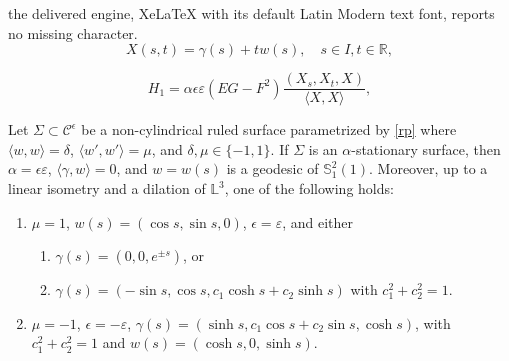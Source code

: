 \documentclass[10pt,a4paper]{amsart}
\def\l{\mathbb L}
\def\r{\mathbb R}
\def\s{\mathbb S}
\begin{document}
the delivered engine, XeLaTeX with its default Latin Modern text font, reports no missing character.
\begin{equation}
X(s,t)=\gamma(s)+tw(s), \quad s\in I, t\in \r,\label{rp}
\end{equation}

\begin{equation}
H_1=\alpha\epsilon\varepsilon(EG-F^2)\frac{(X_s,X_t,X)}{\langle X,X\rangle}, \label{ss3}
\end{equation}

\begin{theorem} \label{th-nli}
Let $\Sigma \subset \mathcal{C}^\epsilon$ be a   non-cylindrical ruled surface parametrized by \eqref{rp} where $\langle w,w\rangle=\delta$, $\langle w',w' \rangle=\mu$, and $\delta,\mu\in \{-1,1 \}$. If $\Sigma$ is an $\alpha$-stationary surface, then $\alpha = \epsilon \varepsilon$, $\langle \gamma,w\rangle =0$, and $w=w(s)$ is a geodesic of $\s_1^2(1)$. Moreover, up to a linear isometry and a dilation of $\l^3$, one of the following holds:
\begin{enumerate}
\item $\mu=1$, $w(s)=(\cos s,\sin s,0)$, $\epsilon= \varepsilon$, and either
\begin{enumerate}
\item[\textnormal{(1a)}] $\gamma(s)=(0,0,e^{\pm s})$, or
\item[\textnormal{(1b)}]  $\gamma(s)=(-\sin s,\cos s,c_1 \cosh s+c_2 \sinh s)$ with $c_1^2+c_2^2=1$.
\end{enumerate}
\item $\mu=-1$,  $\epsilon= -\varepsilon$, $\gamma(s)=(\sinh s, c_1\cos s+c_2\sin s, \cosh s)$, with $c_1^2+c_2^2=1$ and $w(s)=(\cosh s,0,\sinh s)$.
 
\end{enumerate}
\end{theorem}
\end{document}
